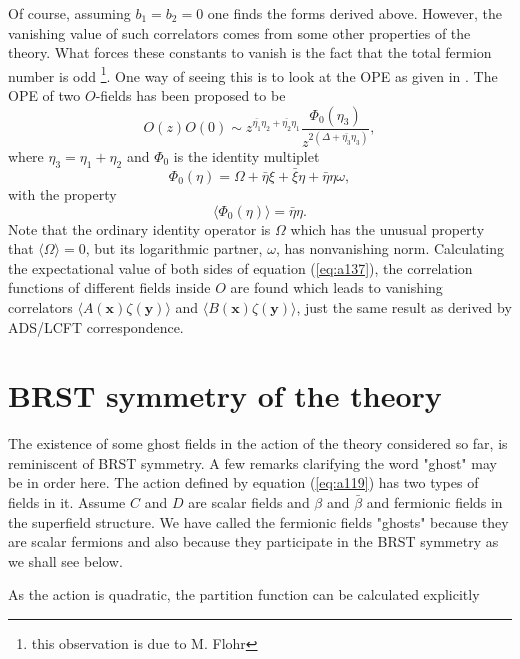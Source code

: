 \documentclass[a4paper,11pt]{article}
\begin{document}
Of course, assuming $b_1=b_2=0$ one finds the forms derived above.
However, the vanishing value of such correlators comes from some
other properties of the theory. What forces these constants to
vanish is the fact that the total fermion number is odd
\footnote{this observation is due to M. Flohr}. One way of seeing
this is to look at the OPE as given in \cite{mog}. The OPE of two
$O$-fields has been proposed to be
\begin{equation}\label{eq:a137}
O(z)O(0)\sim z^{\bar{\eta_1}\eta_2+\bar{\eta_2}\eta_1}
\frac{\Phi_0(\eta_3)}{z^{2(\Delta+\bar{\eta_3}\eta_3)}},
\end{equation}
where $\eta_3=\eta_1+\eta_2$ and $\Phi_0$ is the identity
multiplet
\begin{equation}\label{eq:a138}
\Phi_0(\eta)=\Omega +
\bar{\eta}\xi+\bar{\xi}\eta+\bar{\eta}\eta\omega,
\end{equation}
with the property
\begin{equation}\label{eq:a139}
\langle\Phi_0(\eta)\rangle=\bar{\eta}\eta.
\end{equation}
Note that the ordinary identity operator is $\Omega$ which has
the unusual property that $\langle\Omega\rangle=0$, but its
logarithmic partner, $\omega$, has nonvanishing norm. Calculating
the expectational value of both sides of equation
(\ref{eq:a137}), the correlation functions of different fields
inside $O$ are found which leads to vanishing correlators $
\langle A(\mathbf{x})\zeta(\mathbf{y})\rangle $ and $\langle
B(\mathbf{x})\zeta(\mathbf{y}) \rangle $, just the same result as
derived by ADS/LCFT correspondence.
\section{BRST symmetry of the theory}
The existence of some ghost fields in the action of the theory
considered so far, is reminiscent of BRST symmetry. A few remarks
clarifying the word "ghost" may be in order here. The action
defined by equation (\ref{eq:a119}) has two types of fields in it.
Assume  $C$ and $D$ are scalar fields and $\beta$ and
$\bar{\beta}$ and fermionic fields in the superfield structure.
We have called the fermionic fields "ghosts" because they are
scalar fermions and also because they participate in the BRST
symmetry as we shall see below.

As the action is quadratic, the partition function can be
calculated explicitly
\end{document}

